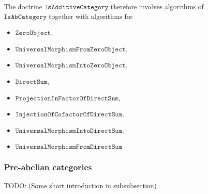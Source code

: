 \begin{doctrine}
The doctrine $\mathtt{IsAdditiveCategory}$ therefore involves algorithms of $\mathtt{IsAbCategory}$ together with algorithms for
\begin{itemize}
 \item $\mathtt{ZeroObject}$,
 \item $\mathtt{UniversalMorphismFromZeroObject}$,
 \item $\mathtt{UniversalMorphismIntoZeroObject}$,
 \item $\mathtt{DirectSum}$,
 \item $\mathtt{ProjectionInFactorOfDirectSum}$,
 \item $\mathtt{InjectionOfCofactorOfDirectSum}$,
 \item $\mathtt{UniversalMorphismIntoDirectSum}$,
 \item $\mathtt{UniversalMorphismFromDirectSum}$
\end{itemize}
\end{doctrine}

\subsubsection{Pre-abelian categories}

TODO: (Some short introduction in subsubsection)

